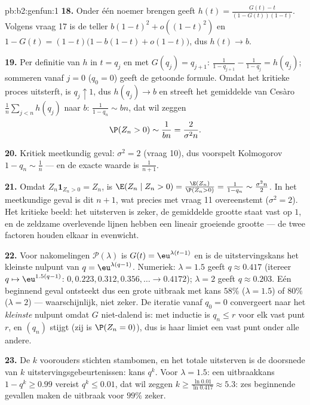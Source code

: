 \begin{solution}{pb:b2:genfun:1}
\textbf{18.} Onder één noemer brengen geeft $h(t) = \frac{G(t) -
t}{(1 - G(t))(1 - t)}$. Volgens vraag 17 is de teller $b(1-t)^2 +
o((1-t)^2)$ en $1 - G(t) = (1 - t)\bigl(1 - b(1-t) +
o(1-t)\bigr)$, dus $h(t) \to b$.

\textbf{19.} Per definitie van $h$ in $t = q_j$ en met $G(q_j) =
q_{j+1}$: $\frac1{1 - q_{j+1}} - \frac1{1-q_j} = h(q_j)$; sommeren
vanaf $j = 0$ ($q_0 = 0$) geeft de getoonde formule. Omdat het
kritieke proces uitsterft, is $q_j \uparrow 1$, dus $h(q_j) \to b$
en streeft het gemiddelde van Cesàro $\frac1n\sum_{j<n}h(q_j)$ naar
$b$: $\frac1{1-q_n} \sim bn$, dat wil zeggen
\[
\P(Z_n > 0) \sim \frac1{bn} = \frac{2}{\sigma^2 n} .
\]

\textbf{20.} Kritiek meetkundig geval: $\sigma^2 = 2$ (vraag 10),
dus voorspelt Kolmogorov $1 - q_n \sim \frac1n$ --- en de exacte
waarde is $\frac1{n+1}$.

\textbf{21.} Omdat $Z_n\mathbf 1_{Z_n > 0} = Z_n$, is $\E(Z_n \mid
Z_n > 0) = \frac{\E(Z_n)}{\P(Z_n > 0)} = \frac1{1 - q_n} \sim
\frac{\sigma^2n}2$. In het meetkundige geval is dit $n + 1$, wat
precies met vraag 11 overeenstemt ($\sigma^2 = 2$). Het kritieke
beeld: het uitsterven is zeker, de gemiddelde grootte staat vast op
$1$, en de zeldzame overlevende lijnen hebben een lineair groeiende
grootte --- de twee factoren houden elkaar in evenwicht.

\textbf{22.} Voor nakomelingen $\mathcal P(\lambda)$ is $G(t) =
\eu^{\lambda(t-1)}$ en is de uitstervingskans het kleinste nulpunt
van $q = \eu^{\lambda(q-1)}$. Numeriek: $\lambda = 1.5$ geeft $q
\approx 0.417$ (itereer $q \mapsto \eu^{1.5(q-1)}$: $0, 0.223,
0.312, 0.356, \dots \to 0.4172$); $\lambda = 2$ geeft $q \approx
0.203$. Eén beginnend geval ontsteekt dus een grote uitbraak met
kans $58\%$ ($\lambda = 1.5$) of $80\%$ ($\lambda = 2$) ---
waarschijnlijk, niet zeker. De iteratie vanaf $q_0 = 0$ convergeert
naar het \emph{kleinste} nulpunt omdat $G$ niet-dalend is: met
inductie is $q_n \leq r$ voor elk vast punt $r$, en $(q_n)$ stijgt
(zij is $\P(Z_n = 0)$), dus is haar limiet een vast punt onder alle
andere.

\textbf{23.} De $k$ voorouders stichten  stambomen,
en het totale uitsterven is de doorsnede van $k$ 
uitstervingsgebeurtenissen: kans $q^k$. Voor $\lambda = 1.5$: een
uitbraakkans $1 - q^k \geq 0.99$ vereist $q^k \leq 0.01$, dat wil
zeggen $k \geq \frac{\ln 0.01}{\ln 0.417} \approx 5.3$: zes
beginnende gevallen maken de uitbraak voor $99\%$ zeker.


\end{solution}
